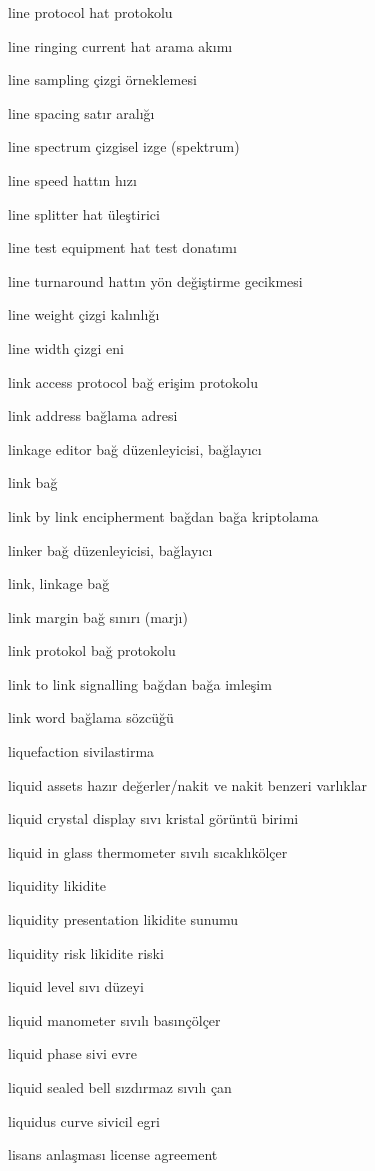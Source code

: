 \documentclass[12pt,fleqn]{article}\usepackage{../../common}
\begin{document}
line protocol hat protokolu

line ringing current hat arama akımı

line sampling çizgi örneklemesi

line spacing satır aralığı

line spectrum çizgisel izge (spektrum)

line speed hattın hızı

line splitter hat üleştirici

line test equipment hat test donatımı

line turnaround hattın yön değiştirme gecikmesi

line weight çizgi kalınlığı

line width çizgi eni

link access protocol bağ erişim protokolu

link address bağlama adresi

linkage editor bağ düzenleyicisi, bağlayıcı

link bağ

link by link encipherment bağdan bağa kriptolama

linker bağ düzenleyicisi, bağlayıcı

link, linkage bağ

link margin bağ sınırı (marjı)

link protokol bağ protokolu

link to link signalling bağdan bağa imleşim

link word bağlama sözcüğü

liquefaction sivilastirma

liquid assets hazır değerler/nakit ve nakit benzeri varlıklar

liquid crystal display sıvı kristal görüntü birimi

liquid in glass thermometer sıvılı sıcaklıkölçer

liquidity likidite

liquidity presentation likidite sunumu

liquidity risk likidite riski

liquid level sıvı düzeyi

liquid manometer sıvılı basınçölçer

liquid phase sivi evre

liquid sealed bell sızdırmaz sıvılı çan

liquidus curve sivicil egri

lisans anlaşması license agreement
\end{document}
